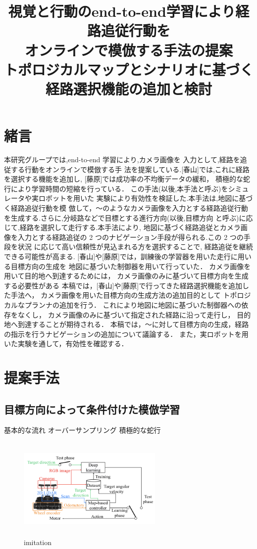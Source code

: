 \documentclass{sice-si}
\title{視覚と行動のend-to-end学習により経路追従行動を\\
オンラインで模倣する手法の提案\\
トポロジカルマップとシナリオに基づく経路選択機能の追加と検討\\
}
\begin{document}

\maketitle

\section{緒言}
本研究グループでは,end-to-end 学習により,カメラ画像を
入力として,経路を追従する行動をオンラインで模倣する手
法を提案している.[春山]では,これに経路を選択する機能を追加し,
[藤原]では成功率の不均衡データの緩和，
積極的な蛇行により学習時間の短縮を行っている．
この手法(以後,本手法と呼ぶ)をシミュレータや実ロボットを用いた
実験により有効性を検証した.本手法は,地図に基づく経路追従行動を模
倣して，〜のようなカメラ画像を入力とする経路追従行動
を生成する.さらに,分岐路などで目標とする進行方向(以後,目標方向
と呼ぶ)に応じて,経路を選択して走行する.本手法により,
地図に基づく経路追従とカメラ画像を入力とする経路追従の
2 つのナビゲーション手段が得られる.この 2 つの手段を状況
に応じて高い信頼性が見込まれる方を選択することで,
経路追従を継続できる可能性が高まる.
[春山]や[藤原]では，訓練後の学習器を用いた走行に用いる目標方向の生成を
地図に基づいた制御器を用いて行っていた．
カメラ画像を用いて目的地へ到達するためには，
カメラ画像のみに基づいて目標方向を生成する必要性がある
本稿では，[春山]や[藤原]で行ってきた経路選択機能を追加した手法へ，
カメラ画像を用いた目標方向の生成方法の追加目的として
トポロジカルなプランナの追加を行う．
これにより地図に地図に基づいた制御器への依存をなくし，
カメラ画像のみに基づいて指定された経路に沿って走行し，
目的地へ到達することが期待される．
本稿では，〜に対して目標方向の生成，経路の指示を行うナビゲーションの追加について議論する．
また，実ロボットを用いた実験を通して，有効性を確認する．


\section{提案手法}
\subsection{目標方向によって条件付けた模倣学習}
基本的な流れ
オーバーサンプリング
積極的な蛇行
\begin{figure}[htbp]
    \begin{center}
    \includegraphics[width=70mm,height=50mm]{./figs/imitation.png}
    \caption{imitation}
    \end{center}
    \label{fig:imitation}
\end{figure}
\end{document}
